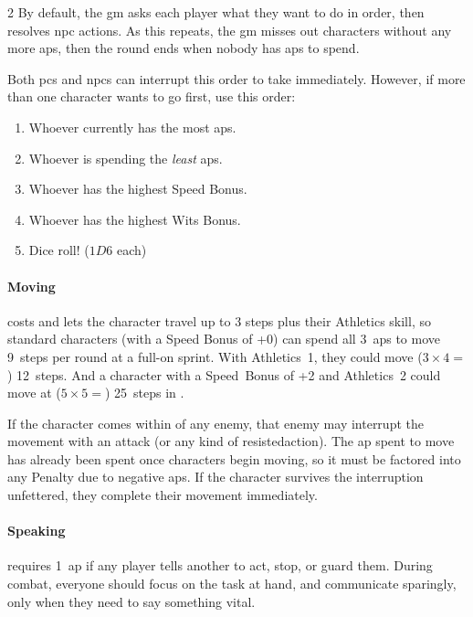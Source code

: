\begin{multicols}{2}
By default, the \gls{gm} asks each player what they want to do in order, then resolves \gls{npc} actions.
As this repeats, the \gls{gm} misses out characters without any more \glspl{ap}, then the \gls{round} ends when nobody has \glspl{ap} to spend.

Both \glspl{pc} and \glspl{npc} can interrupt this order to take  immediately.
However, if more than one character wants to go first, use this order:

\begin{enumerate}
  \item
  Whoever currently has the most \glspl{ap}.
  \item
  Whoever is spending the \emph{least} \glspl{ap}.
  \item
  Whoever has the highest Speed Bonus.
  \item
  Whoever has the highest Wits Bonus.
  \item
  Dice roll! ($1D6$ each)
\end{enumerate}

\paragraph{Moving}
\label{moving}
costs  and lets the character travel up to 3 steps plus their
Athletics \gls{skill}, so standard characters (with a Speed Bonus of +0) can
spend all 3~\glspl{ap} to move 9~\glspl{step} per \gls{round} at a full-on
sprint.  With Athletics~1, they could move ($3 \times 4 =$) 12~\glspl{step}.
And a character with a Speed~Bonus of +2 and Athletics~2 could move at ($5
\times 5 =$) 25~\glspl{step} in .

If the character comes within  of any enemy, that enemy may
interrupt the movement with an attack (or any kind of \gls{resistedaction}).
The \gls{ap} spent to move has already been spent once characters begin moving, so it must be factored into any Penalty due to negative \glspl{ap}.
If the character survives the interruption unfettered, they complete their movement immediately.

\paragraph{Speaking}
requires 1~\gls{ap} if any player tells another to act, stop, or guard them.
During combat, everyone should focus on the task at hand, and communicate sparingly, only when they need to say something vital.


\end{multicols}
